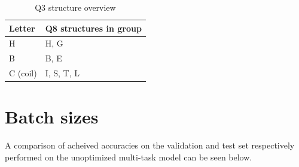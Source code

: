 \begin{table}
\caption{Q3 structure overview}
\centering
\begin{tabular}{l|l}
\hline
Letter		& Q8 structures in group	\\ \hline
H			& H, G						\\
B			& B, E						\\
C (coil)	& I, S, T, L				\\
\end{tabular}
\end{table}

\section*{Batch sizes}
A comparison of acheived accuracies on the validation and test set respectively performed on the unoptimized multi-task model can be seen below.
